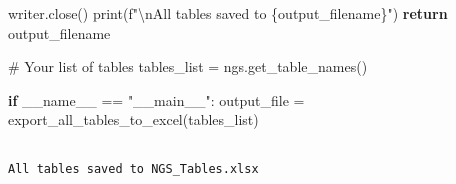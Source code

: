 \documentclass[
  11pt,
  a4paper,
]{article}
\newenvironment{Shaded}{\begin{snugshade}}{\end{snugshade}}
\newcommand{\BuiltInTok}[1]{\textcolor[rgb]{0.00,0.23,0.31}{#1}}
\newcommand{\CharTok}[1]{\textcolor[rgb]{0.13,0.47,0.30}{#1}}
\newcommand{\CommentTok}[1]{\textcolor[rgb]{0.37,0.37,0.37}{#1}}
\newcommand{\ControlFlowTok}[1]{\textcolor[rgb]{0.00,0.23,0.31}{\textbf{#1}}}
\newcommand{\NormalTok}[1]{\textcolor[rgb]{0.00,0.23,0.31}{#1}}
\newcommand{\OperatorTok}[1]{\textcolor[rgb]{0.37,0.37,0.37}{#1}}
\newcommand{\SpecialCharTok}[1]{\textcolor[rgb]{0.37,0.37,0.37}{#1}}
\newcommand{\SpecialStringTok}[1]{\textcolor[rgb]{0.13,0.47,0.30}{#1}}
\newcommand{\StringTok}[1]{\textcolor[rgb]{0.13,0.47,0.30}{#1}}
\newcommand{\VariableTok}[1]{\textcolor[rgb]{0.07,0.07,0.07}{#1}}
\begin{document}
\begin{Shaded}
\begin{Highlighting}[]
\NormalTok{    writer.close()}
    \BuiltInTok{print}\NormalTok{(}\SpecialStringTok{f"}\CharTok{\textbackslash{}n}\SpecialStringTok{All tables saved to }\SpecialCharTok{\{}\NormalTok{output\_filename}\SpecialCharTok{\}}\SpecialStringTok{"}\NormalTok{)}
    \ControlFlowTok{return}\NormalTok{ output\_filename}

\CommentTok{\# Your list of tables}
\NormalTok{tables\_list }\OperatorTok{=}\NormalTok{ ngs.get\_table\_names()}

\ControlFlowTok{if} \VariableTok{\_\_name\_\_} \OperatorTok{==} \StringTok{"\_\_main\_\_"}\NormalTok{:}
\NormalTok{    output\_file }\OperatorTok{=}\NormalTok{ export\_all\_tables\_to\_excel(tables\_list)}
\end{Highlighting}
\end{Shaded}

\begin{verbatim}

All tables saved to NGS_Tables.xlsx
\end{verbatim}
\end{document}
